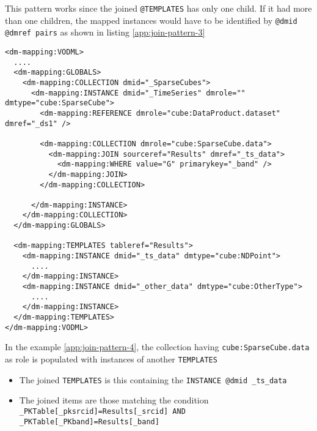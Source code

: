 This pattern works since the joined \texttt{@TEMPLATES} has only one child. 
If it had more than one children, the mapped instances would have to be identified by  \texttt{@dmid \texttt{@dmref} pairs} as shown in listing \ref{app:join-pattern-3}

\begin{lstlisting}[frame=single,label={app:join-pattern-3},caption={Joining a \texttt{TEMPLATES} with a global \texttt{COLLECTION} identified by both \texttt{@sourceref} and \texttt{@dmid} \texttt{@dmref} pairs},style=XML,basicstyle=\tiny]
<dm-mapping:VODML>
  ....
  <dm-mapping:GLOBALS>
    <dm-mapping:COLLECTION dmid="_SparseCubes">
      <dm-mapping:INSTANCE dmid="_TimeSeries" dmrole="" dmtype="cube:SparseCube">
        <dm-mapping:REFERENCE dmrole="cube:DataProduct.dataset" dmref="_ds1" />
        
        <dm-mapping:COLLECTION dmrole="cube:SparseCube.data">
          <dm-mapping:JOIN sourceref="Results" dmref="_ts_data">
            <dm-mapping:WHERE value="G" primarykey="_band" />
          </dm-mapping:JOIN>
        </dm-mapping:COLLECTION>
        
      </dm-mapping:INSTANCE>
    </dm-mapping:COLLECTION>
  </dm-mapping:GLOBALS>

  <dm-mapping:TEMPLATES tableref="Results">
    <dm-mapping:INSTANCE dmid="_ts_data" dmtype="cube:NDPoint">
      ....
    </dm-mapping:INSTANCE>
    <dm-mapping:INSTANCE dmid="_other_data" dmtype="cube:OtherType">
      ....
    </dm-mapping:INSTANCE>
  </dm-mapping:TEMPLATES>
</dm-mapping:VODML>
\end{lstlisting}  

In the example \ref{app:join-pattern-4}, the collection having \texttt{cube:SparseCube.data} as role is populated with  instances of another \texttt{TEMPLATES}
\begin{itemize}
  \item The joined \texttt{TEMPLATES} is this containing the  \texttt{INSTANCE \texttt{@dmid} \_ts\_data}
  \item The joined items are those matching the condition  \texttt{\_PKTable[\_pksrcid]=Results[\_srcid] AND  \_PKTable[\_PKband]=Results[\_band]}
\end{itemize}


